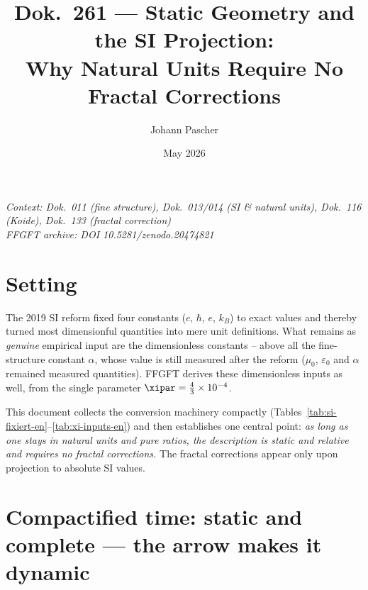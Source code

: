 
\title{Dok.~261 — Static Geometry and the SI Projection:\\
Why Natural Units Require No Fractal Corrections}
\author{Johann Pascher}
\date{May 2026}
\maketitle

\begin{center}
\textit{Context: Dok.~011 (fine structure), Dok.~013/014 (SI \& natural units),
Dok.~116 (Koide), Dok.~133 (fractal correction)} \\[2pt]
\textit{FFGFT archive: DOI 10.5281/zenodo.20474821}
\end{center}

\tableofcontents
\newpage

\section{Setting}

The 2019 SI reform fixed four constants ($c$, $\hbar$, $e$, $k_B$) to exact values
and thereby turned most dimensionful quantities into mere unit definitions. What
remains as \emph{genuine} empirical input are the dimensionless constants -- above
all the fine-structure constant $\alpha$, whose value is still measured after the
reform ($\mu_0$, $\varepsilon_0$ and $\alpha$ remained measured quantities). FFGFT
derives these dimensionless inputs as well, from the single parameter
$\xipar = \tfrac{4}{3}\times 10^{-4}$.

This document collects the conversion machinery compactly
(Tables~\ref{tab:si-fixiert-en}--\ref{tab:xi-inputs-en}) and then establishes one
central point: \emph{as long as one stays in natural units and pure ratios, the
description is static and relative and requires no fractal corrections.} The
fractal corrections appear only upon projection to absolute SI values.

\section{Compactified time: static and complete --- the arrow makes it dynamic}
\label{sec:rahmen}


